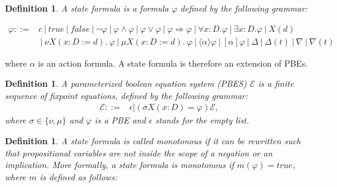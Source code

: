 \documentclass{article}
\newtheorem{definition}[theorem]{Definition}
\begin{document}
\begin{definition}
A state formula is a formula $\varphi $ defined by the following grammar:
\end{definition}

$%
\begin{array}{lc}
\varphi ::= & c~|~true~|~false~|~\lnot \varphi ~|~\varphi \wedge \varphi
~|~\varphi \vee \varphi ~|~\varphi \Rightarrow \varphi ~|~\forall x{:}%
D.\varphi ~|~\exists x{:}D.\varphi ~|~X(d) \\
& ~|~\nu X(x{:}D:=d).~\varphi ~|~\mu X(x{:}D:=d).~\varphi ~|~\langle \alpha
\rangle \varphi ~|~[\alpha ]\varphi ~|~\Delta ~|~\Delta (t)~|~\nabla
~|~\nabla(t)%
\end{array}%
$

where $\alpha $ is an action formula. A state formula is therefore an
extension of PBEs.


\begin{definition}
A parameterized boolean equation system (PBES) $\mathcal{E}$ is a finite
sequence of fixpoint equations, defined by the following grammar:
\begin{equation*}
\begin{array}{lc}
\mathcal{E}::= & \epsilon |(\sigma X(x{:}D)=\varphi )\mathcal{E},%
\end{array}%
\end{equation*}%
where $\sigma \in \{\nu ,\mu \}$ and $\varphi $ is a PBE and $\epsilon $
stands for the empty list.
\end{definition}

\begin{definition}
A state formula is called monotonous if it can be rewritten such that
propositional variables are not inside the scope of a negation or an
implication. More formally, a state formula is monotonous if $m(\varphi
)=true$, where $m$ is defined as follows:
\end{definition}

\newpage
\end{document}
